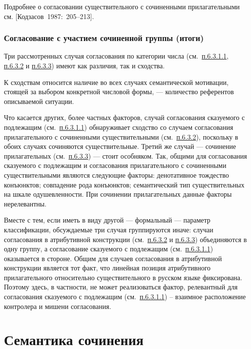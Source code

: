 Подробнее о согласовании существительного с сочиненными прилагательными
см. {[}Кодзасов~1987:~205--213{]}.

\subsubsection{Согласование с участием сочиненной группы
  (итоги)}\label{ux441ux43eux433ux43bux430ux441ux43eux432ux430ux43dux438ux435-ux441-ux443ux447ux430ux441ux442ux438ux435ux43c-ux441ux43eux447ux438ux43dux435ux43dux43dux43eux439-ux433ux440ux443ux43fux43fux44b-ux438ux442ux43eux433ux438}

Три рассмотренных случая согласования по категории числа
(см.~\underline{п.6.3.1.1}, \underline{п.6.3.2} и \underline{п.6.3.3})
имеют как различия, так и сходства.

К сходствам относится наличие во всех случаях семантической мотивации,
стоящей за выбором конкретной числовой формы, --- количество референтов
описываемой ситуации.

Что касается других, более частных факторов, случай согласования
сказуемого с подлежащим (см.~\underline{п.6.3.1.1}) обнаруживает
сходство со случаем согласования прилагательного с сочиненными
существительными (см.~\underline{п.6.3.2}), поскольку в обоих случаях
сочиняются существительные. Третий же случай --- сочинение прилагательных
(см.~\underline{п.6.3.3}) --- стоит особняком. Так, общими для
согласования сказуемого с подлежащим и согласования прилагательного с
сочиненными существительными являются следующие факторы: денотативное
тождество конъюнктов; совпадение рода конъюнктов; семантический тип
существительных на шкале одушевленности. При сочинении прилагательных
данные факторы нерелевантны.

Вместе с тем, если иметь в виду другой --- формальный --- параметр
классификации, обсуждаемые три случая группируются иначе: случаи
согласования в атрибутивной конструкции (см.~\underline{п.6.3.2} и
\underline{п.6.3.3}) объединяются в одну группу, а согласование
сказуемого с подлежащим (см.~\underline{п.6.3.1.1}) оказывается в
стороне. Общим для случаев согласования в атрибутивной конструкции
является тот факт, что линейная позиция атрибутивного прилагательного
относительно существительного в русском языке фиксирована. Поэтому
здесь, в частности, не может реализоваться фактор, релевантный для
согласования сказуемого с подлежащим (см.~\underline{п.6.3.1.1}) --
взаимное расположение контролера и мишени согласования.

\section{Семантика
  сочинения}\label{ux441ux435ux43cux430ux43dux442ux438ux43aux430-ux441ux43eux447ux438ux43dux435ux43dux438ux44f}

